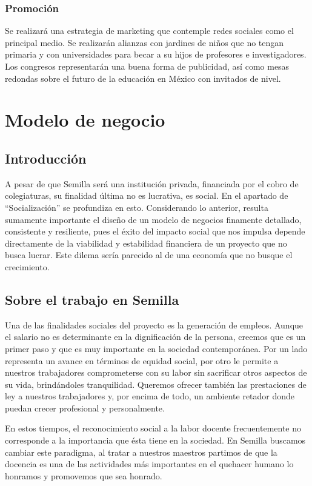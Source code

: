 \documentclass[10pt,letterpaper,oneside]{book}
\begin{document}
\subsection{Promoción}
Se realizará una estrategia de marketing que contemple redes sociales como el principal medio. Se realizarán alianzas con jardines de niños que no tengan primaria y con universidades para becar a su hijos de profesores e investigadores. Los congresos representarán una buena forma de publicidad, así como mesas redondas sobre el futuro de la educación en México con invitados de nivel.


\chapter{Modelo de negocio}

\section{Introducción}
A pesar de que Semilla será una institución privada, financiada por el cobro de colegiaturas, su finalidad última no es lucrativa, es social. En el apartado de ``Socialización'' se profundiza en esto.  Considerando lo anterior, resulta sumamente importante el diseño de un modelo de negocios finamente detallado, consistente y resiliente, pues el éxito del impacto social que nos impulsa depende directamente de la viabilidad y estabilidad financiera de un proyecto que no busca lucrar. Este dilema sería parecido al de una economía que no busque el crecimiento.

\section{Sobre el trabajo en Semilla}
Una de las finalidades sociales del proyecto es la generación de empleos. Aunque el salario no es determinante en la dignificación de la persona, creemos que es un primer paso y que es muy importante en la sociedad contemporánea. Por un lado representa un avance en términos de equidad social, por otro le permite a nuestros trabajadores comprometerse con su labor sin sacrificar otros aspectos de su vida, brindándoles tranquilidad. Queremos ofrecer también las prestaciones de ley a nuestros trabajadores y, por encima de todo, un ambiente retador donde puedan crecer profesional y personalmente.

En estos tiempos, el reconocimiento social a la labor docente frecuentemente no corresponde a la importancia que ésta tiene en la sociedad. En Semilla buscamos cambiar este paradigma, al tratar a nuestros maestros partimos de que la docencia es una de las actividades más importantes en el quehacer humano lo honramos y promovemos que sea honrado.
\end{document}
